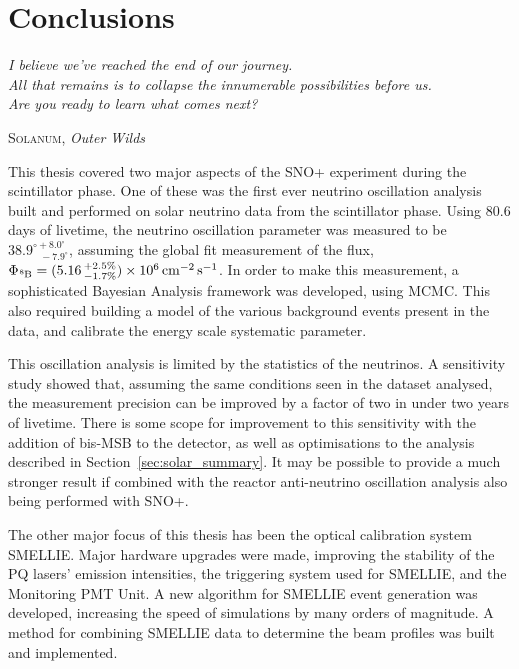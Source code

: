 \chapter{Conclusions}\label{chap:conclusions}
\setlength{\epigraphwidth}{.8\textwidth}
\epigraph{\textit{I believe we've reached the end of our journey.\\All that remains is to collapse the innumerable possibilities before us.\\Are you ready to learn what comes next?}}{\textsc{Solanum}, \textit{Outer Wilds}}
This thesis covered two major aspects of the SNO+ experiment during the scintillator phase. One of these was the first ever neutrino oscillation analysis built and performed on solar neutrino data from the scintillator phase. Using 80.6 days of livetime, the neutrino oscillation parameter \tonetwo{} was measured to be $38.9^{\circ+8.0^{\circ}}_{\phantom{\circ}-7.9^{\circ}}$, assuming the global fit measurement of the \beight{} flux, $\Phi_{\beight{}} = (5.16\,^{+2.5\%}_{-1.7\%})\times 10^{6}\,\si{\per\cm\squared\per\second}$. In order to make this measurement, a sophisticated Bayesian Analysis framework was developed, using MCMC. This also required building a model of the various background events present in the data, and calibrate the energy scale systematic parameter.

This oscillation analysis is limited by the statistics of the \beight{} neutrinos. A sensitivity study showed that, assuming the same conditions seen in the dataset analysed, the measurement precision can be improved by a factor of two in under two years of livetime. There is some scope for improvement to this sensitivity with the addition of bis-MSB to the detector, as well as optimisations to the analysis described in Section~\ref{sec:solar_summary}. It may be possible to provide a much stronger result if combined with the reactor anti-neutrino oscillation analysis also being performed with SNO+.

The other major focus of this thesis has been the optical calibration system SMELLIE. Major hardware upgrades were made, improving the stability of the PQ lasers' emission intensities, the triggering system used for SMELLIE, and the Monitoring PMT Unit. A new algorithm for SMELLIE event generation was developed, increasing the speed of simulations by many orders of magnitude. A method for combining SMELLIE data to determine the beam profiles was built and implemented.

